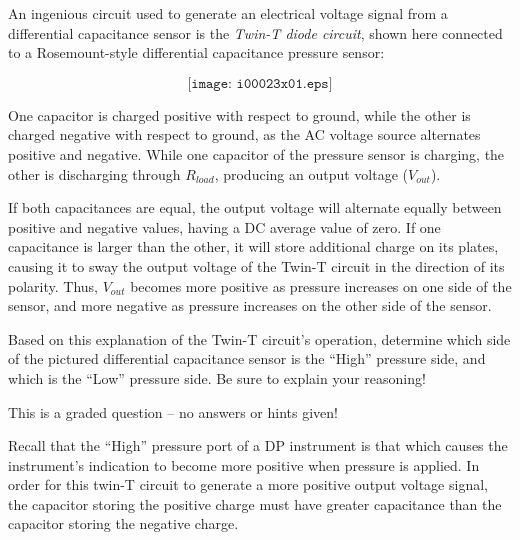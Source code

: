 

An ingenious circuit used to generate an electrical voltage signal from a differential capacitance sensor is the {\it Twin-T diode circuit}, shown here connected to a Rosemount-style differential capacitance pressure sensor:

$$\texttt{[image: i00023x01.eps]}$$

One capacitor is charged positive with respect to ground, while the other is charged negative with respect to ground, as the AC voltage source alternates positive and negative.  While one capacitor of the pressure sensor is charging, the other is discharging through $R_{load}$, producing an output voltage ($V_{out}$).

If both capacitances are equal, the output voltage will alternate equally between positive and negative values, having a DC average value of zero.  If one capacitance is larger than the other, it will store additional charge on its plates, causing it to sway the output voltage of the Twin-T circuit in the direction of its polarity.  Thus, $V_{out}$ becomes more positive as pressure increases on one side of the sensor, and more negative as pressure increases on the other side of the sensor.

\vskip 10pt

Based on this explanation of the Twin-T circuit's operation, determine which side of the pictured differential capacitance sensor is the ``High'' pressure side, and which is the ``Low'' pressure side.  Be sure to explain your reasoning!

\vfil

\eject






This is a graded question -- no answers or hints given!







Recall that the ``High'' pressure port of a DP instrument is that which causes the instrument's indication to become more positive when pressure is applied.  In order for this twin-T circuit to generate a more positive output voltage signal, the capacitor storing the positive charge must have greater capacitance than the capacitor storing the negative charge.  

